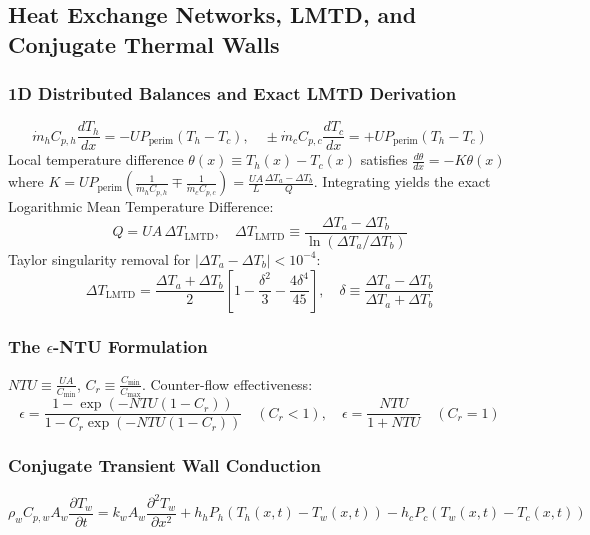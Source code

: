 \documentclass[11pt,a4paper]{article}
\begin{document}
\subsection{Heat Exchange Networks, LMTD, and Conjugate Thermal Walls}

\subsubsection{1D Distributed Balances and Exact LMTD Derivation}
\begin{equation}
\dot{m}_h C_{p,h} \frac{d T_h}{dx} = -U P_{\text{perim}} (T_h - T_c), \quad \pm \dot{m}_c C_{p,c} \frac{d T_c}{dx} = +U P_{\text{perim}} (T_h - T_c)
\end{equation}
Local temperature difference $\theta(x) \equiv T_h(x) - T_c(x)$ satisfies $\frac{d\theta}{dx} = -K \theta(x)$ where $K = U P_{\text{perim}} \left( \frac{1}{\dot{m}_h C_{p,h}} \mp \frac{1}{\dot{m}_c C_{p,c}} \right) = \frac{U A}{L} \frac{\Delta T_a - \Delta T_b}{Q}$. Integrating yields the exact Logarithmic Mean Temperature Difference:
\begin{equation}
Q = U A \, \Delta T_{\text{LMTD}}, \quad \Delta T_{\text{LMTD}} \equiv \frac{\Delta T_a - \Delta T_b}{\ln(\Delta T_a / \Delta T_b)}
\end{equation}
Taylor singularity removal for $|\Delta T_a - \Delta T_b| < 10^{-4}$:
\begin{equation}
\Delta T_{\text{LMTD}} = \frac{\Delta T_a + \Delta T_b}{2} \left[ 1 - \frac{\delta^2}{3} - \frac{4\delta^4}{45} \right], \quad \delta \equiv \frac{\Delta T_a - \Delta T_b}{\Delta T_a + \Delta T_b}
\end{equation}

\subsubsection{The $\epsilon$-NTU Formulation}
$NTU \equiv \frac{UA}{C_{\min}}$, $C_r \equiv \frac{C_{\min}}{C_{\max}}$. Counter-flow effectiveness:
\begin{equation}
\epsilon = \frac{1 - \exp(-NTU(1 - C_r))}{1 - C_r \exp(-NTU(1 - C_r))} \quad (C_r < 1), \quad \epsilon = \frac{NTU}{1 + NTU} \quad (C_r = 1)
\end{equation}

\subsubsection{Conjugate Transient Wall Conduction}
\begin{equation}
\rho_w C_{p,w} A_w \frac{\partial T_w}{\partial t} = k_w A_w \frac{\partial^2 T_w}{\partial x^2} + h_h P_h (T_h(x, t) - T_w(x, t)) - h_c P_c (T_w(x, t) - T_c(x, t))
\end{equation}
\end{document}
